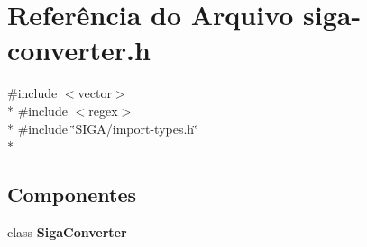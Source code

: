 \section{Referência do Arquivo siga-\/converter.h}
\label{siga-converter_8h}
{\ttfamily \#include $<$vector$>$}\\*
{\ttfamily \#include $<$regex$>$}\\*
{\ttfamily \#include \char`\"{}S\+I\+G\+A/import-\/types.\+h\char`\"{}}\\*
\subsection*{Componentes}
\begin{DoxyCompactItemize}
\item 
class {\bf Siga\+Converter}
\end{DoxyCompactItemize}
